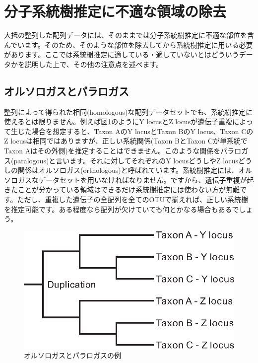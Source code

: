 \documentclass[titlepage,10pt,a4paper]{jsbook}
\begin{document}
\section{分子系統樹推定に不適な領域の除去}

大抵の整列した配列データには、そのままでは分子系統樹推定に不適な部位を含んでいます。そのため、そのような部位を除去してから系統樹推定に用いる必要があります。ここでは系統樹推定に適している・適していないとはどういうデータかを説明した上で、その他の注意点を述べます。

\subsection{オルソロガスとパラロガス}

整列によって得られた相同(homologous)な配列データセットでも、系統樹推定に使えるとは限りません。例えば図\ref{figure:orthology_paralogy}のようにY locusとZ locusが遺伝子重複によって生じた場合を想定すると、Taxon AのY locusとTaxon BのY locus、Taxon CのZ locusは相同ではありますが、正しい系統関係(Taxon BとTaxon Cが単系統でTaxon Aはその外側)を推定することはできません。このような関係をパラロガス(paralogous)と言います。それに対してそれぞれのY locusどうしやZ locusどうしの関係はオルソロガス(orthologous)と呼ばれています。系統樹推定には、オルソロガスなデータセットを用いなければなりません。ですから、遺伝子重複が起きたことが分かっている領域はできるだけ系統樹推定には使わない方が無難です。ただし、重複した遺伝子の全配列を全てのOTUで揃えれば、正しい系統樹を推定可能です。ある程度なら配列が欠けていても何とかなる場合もあるでしょう。
\begin{figure}[h]
\begin{center}
\caption{オルソロガスとパラロガスの例}\label{figure:orthology_paralogy}
\includegraphics[width=\linewidth,keepaspectratio]{orthology_paralogy.eps}
\end{center}
\end{figure}
\end{document}
